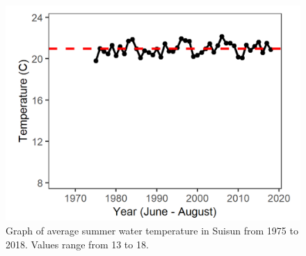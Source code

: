 \documentclass[
]{book}
\begin{document}
\begin{panel-grid}
\begin{columns-nocenter}
\begin{column800}
\begin{expand}
\end{expand}

\end{column800}

\begin{column40}

~

\end{column40}

\begin{column800}

\begin{expand}

\begin{figure}
\includegraphics[width=15.25in]{figures/temp_sssummer} \caption{Graph of average summer water temperature in Suisun from 1975 to 2018. Values range from 13 to 18.}\label{fig:unnamed-chunk-58}
\end{figure}

\end{expand}

\end{column800}

\begin{column40}

~

\end{column40}

\begin{column800}

\begin{expand}


\end{expand}
\end{column800}
\end{columns-nocenter}
\end{panel-grid}
\end{document}
